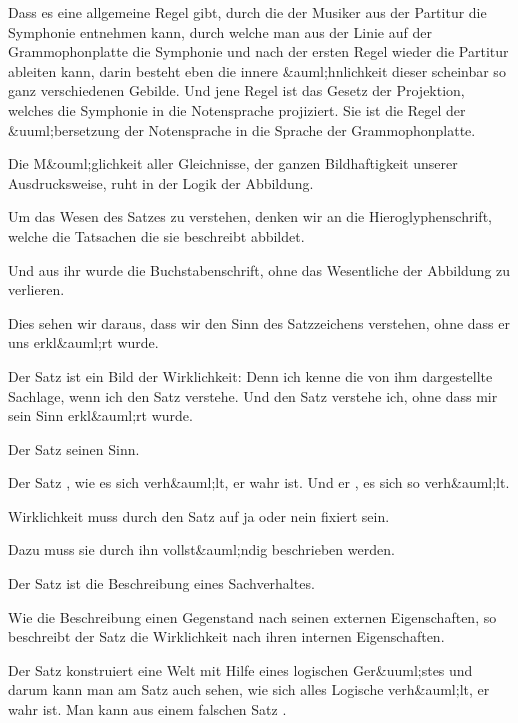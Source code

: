 {Dass es eine allgemeine Regel gibt, durch die
der Musiker aus der Partitur die Symphonie
entnehmen kann, durch welche man aus der Linie
auf der Grammophonplatte die Symphonie und
nach der ersten Regel wieder die Partitur ableiten
kann, darin besteht eben die innere &auml;hnlichkeit
dieser scheinbar so ganz verschiedenen Gebilde.
Und jene Regel ist das Gesetz der Projektion,
welches die Symphonie in die Notensprache projiziert.
Sie ist die Regel der &uuml;bersetzung der
Notensprache in die Sprache der Grammophonplatte.}


{Die M&ouml;glichkeit aller Gleichnisse, der ganzen
Bildhaftigkeit unserer Ausdrucksweise, ruht in der
Logik der Abbildung.}


{Um das Wesen des Satzes zu verstehen, denken
wir an die Hieroglyphenschrift, welche die Tatsachen
die sie beschreibt abbildet.

Und aus ihr wurde die Buchstabenschrift, ohne
das Wesentliche der Abbildung zu verlieren.}


{Dies sehen wir daraus, dass wir den Sinn des
Satzzeichens verstehen, ohne dass er uns erkl&auml;rt
wurde.}


{Der Satz ist ein Bild der Wirklichkeit: Denn
ich kenne die von ihm dargestellte Sachlage, wenn
ich den Satz verstehe. Und den Satz verstehe ich,
ohne dass mir sein Sinn erkl&auml;rt wurde.}


{Der Satz  seinen Sinn.

Der Satz , wie es sich verh&auml;lt,  er
wahr ist. Und er ,  es sich so verh&auml;lt.}


{ Wirklichkeit muss durch den Satz auf ja
oder nein fixiert sein.

Dazu muss sie durch ihn vollst&auml;ndig beschrieben
werden.

Der Satz ist die Beschreibung eines Sachverhaltes.

Wie die Beschreibung einen Gegenstand nach
seinen externen Eigenschaften, so beschreibt der
Satz die Wirklichkeit nach ihren internen Eigenschaften.

Der Satz konstruiert eine Welt mit Hilfe eines
logischen Ger&uuml;stes und darum kann man am Satz
auch sehen, wie sich alles Logische verh&auml;lt, 
er wahr ist. Man kann aus einem falschen Satz
.}


